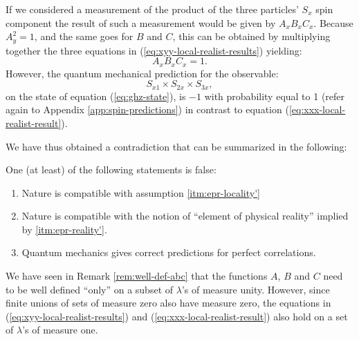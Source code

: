 If we considered a measurement of the product of the three particles' $S_x$ spin component the result of such a measurement would be given by $A_x B_x C_x$. Because $A_y^2 = 1$, and the same goes for $B$ and $C$, this can be obtained by multiplying together the three equations in (\ref{eq:xyy-local-realist-results}) yielding:
\begin{equation}
  A_x B_x C_x = 1.
  \label{eq:xxx-local-realist-result}
\end{equation}
However, the quantum mechanical prediction for the observable:
\begin{equation}
  S_{x1} \times S_{2x} \times S_{3x},
  \label{eq:xxx-observable}
\end{equation}
on the state of equation (\ref{eq:ghz-state}), is $- 1$ with probability equal to 1 (refer again to Appendix \ref{app:spin-predictions}) in contrast to equation (\ref{eq:xxx-local-realist-result}).

We have thus obtained a contradiction that can be summarized in the following:
\begin{theorem}
  One (at least) of the following statements is false:
  \begin{enumerate}[label=(\roman*)]
  \item \label{itm:ghz-theorem-locality} Nature is compatible with assumption \ref{itm:epr-locality'}
  \item \label{itm:ghz-theorem-reality} Nature is compatible with the notion of ``element of physical reality'' implied by \ref{itm:epr-reality'}.
  \item Quantum mechanics gives correct predictions for perfect correlations.
  \end{enumerate}
\end{theorem}

\begin{remark}
  We have seen in Remark \ref{rem:well-def-abc} that the functions $A$, $B$ and $C$ need to be well defined ``only'' on a subset of $\lambda$'s of measure unity. However, since finite unions of sets of measure zero also have measure zero, the equations in (\ref{eq:xyy-local-realist-results}) and (\ref{eq:xxx-local-realist-result}) also hold on a set of $\lambda$'s of measure one.
\end{remark}

%

